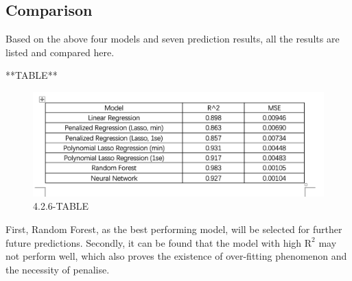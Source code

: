 \subsection{Comparison} %
Based on the above four models and seven prediction results, all the results are listed and compared here. 

**TABLE**
\begin{figure}[htbp]
\centering
\includegraphics[width = 1.0\textwidth]{Figure/4.2.6-TABLE.png}
\caption{4.2.6-TABLE}
\label{4.2.6-TABLE}
\end{figure}

First, Random Forest, as the best performing model, will be selected for further future predictions. Secondly, it can be found that the model with high $\text{R}^2$ may not perform well, which also proves the existence of over-fitting phenomenon and the necessity of penalise.